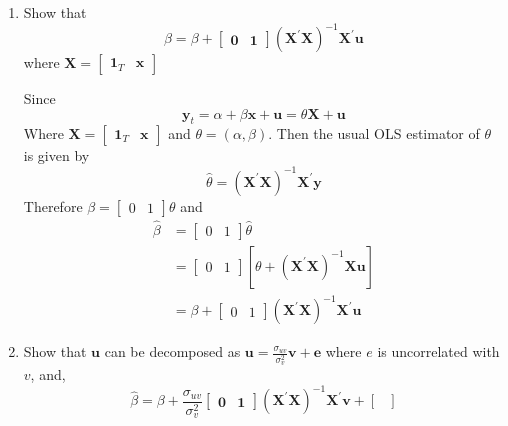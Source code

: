 \documentclass[12pt,twoside]{article}
\begin{document}
\begin{enumerate}[label = (\alph*)]
    \item  Show that 
    \[
        \widehat\beta = \beta + \begin{bmatrix}
            \mathbf{0} & \mathbf{1} 
        \end{bmatrix}(\mathbf{X}^\prime \mathbf{X})^{-1}\mathbf{X}^\prime \mathbf{u}
    \]
    where \(\mathbf{X} = \begin{bmatrix} \mathbf{1}_T & \mathbf x \end{bmatrix}\)
    \begin{solution}
        Since
        \[
            \mathbf y_t = \alpha + \beta \mathbf x + \mathbf u = \theta\mathbf X + \mathbf u
        \]
        Where \(\mathbf X = \begin{bmatrix} \mathbf 1_T & \mathbf x \end{bmatrix}\) and \(\theta = (\alpha , \beta)\). Then the usual OLS estimator of \(\theta\) is given by
        \[
            \widehat \theta = \left(\mathbf X^\prime \mathbf X \right)^{-1}\mathbf X^\prime \mathbf y
        \]
        Therefore \(\beta = \begin{bmatrix} 0 & 1 \end{bmatrix}\theta \) and
        \begin{align*}
            \widehat\beta & = \begin{bmatrix} 0 & 1 \end{bmatrix}\widehat\theta \\
            & = \begin{bmatrix} 0 & 1 \end{bmatrix}\left[\theta + \left(\mathbf X^\prime\mathbf X\right)^{-1}\mathbf X \mathbf u\right] \\
            & = \beta + \begin{bmatrix} 0 & 1 \end{bmatrix} \left(\mathbf X^\prime \mathbf X\right)^{-1}\mathbf X^\prime \mathbf u
        \end{align*}
    \end{solution}
    \item Show that \(\mathbf{u}\) can be decomposed as \(\mathbf{u} = \frac{\sigma_{uv}}{\sigma_v^2}\mathbf v + \mathbf e\) where \(e\) is uncorrelated with \(v\), and,
    \[
        \widehat \beta = \beta + \frac{\sigma_{uv}}{\sigma_v^2}\begin{bmatrix}
            \mathbf{0} & \mathbf{1}
        \end{bmatrix}\left(\mathbf{X}^\prime \mathbf{X}\right)^{-1}\mathbf{X}^\prime \mathbf{v} + \begin{bmatrix}

\end{bmatrix}\]
\end{enumerate}
\end{document}
